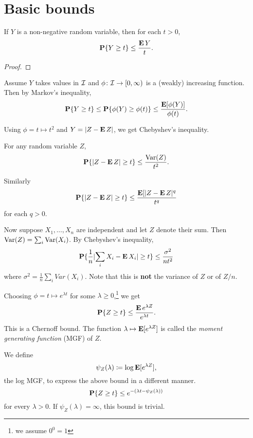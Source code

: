 \chapter{Basic bounds} \label{chp:1}
\begin{theorem} \label{thm:markov}
    If $Y$ is a non-negative random variable, then for each $t > 0$, \[
        \operatorname{\mathbf P} \{Y \ge t\} \le \frac{\operatorname{\mathbf E} Y}{t}.
    \]
\end{theorem}
\begin{proof}

\end{proof}
Assume $Y$ takes values in $\mathcal{I}$ and $\phi\colon \mcI \to [0, \infty)$ is a
(weakly) increasing function.
Then by Markov's inequality, \[
    \P\set{Y \ge t} \le \P\set{\phi(Y) \ge \phi(t)}
        \le \frac{\E[\phi(Y)]}{\phi(t)}.
\]

Using $\phi = t \mapsto t^2$ and $Y = \lvert Z - \operatorname{\mathbf E} Z\rvert$, we get Chebyshev's
inequality.
\begin{theorem} \label{thm:chebyshev}
    For any random variable $Z$, \[
        \operatorname{\mathbf P}\{\lvert Z - \operatorname{\mathbf E} Z\rvert \ge t\} \le \frac{\operatorname{Var}(Z)}{t^2}.
    \]
\end{theorem}
Similarly \[
    \operatorname{\mathbf P}\{\lvert Z - \operatorname{\mathbf E} Z\rvert \ge t\} \le \frac{\operatorname{\mathbf E}[\lvert Z - \operatorname{\mathbf E} Z\rvert^q}{t^q}
\] for each $q > 0$.

Now suppose $X_1, \dots, X_n$ are independent and let $Z$ denote their sum.
Then $\operatorname{Var}(Z) = \sum_i \operatorname{Var}(X_i)$.
By Chebyshev's inequality, \[
    \operatorname{\mathbf P}\{\frac1n \lvert\sum_i X_i - \operatorname{\mathbf E} X_i\rvert \ge t\} \le \frac{\sigma^2}{nt^2}
\] where $\sigma^2 = \frac1n \sum_i Var(X_i)$.
Note that this is \textbf{not} the variance of $Z$ or of $Z/n$.

Choosing $\phi = t \mapsto e^{\lambda t}$ for some $\lambda \ge 0$,\footnote{we assume $0^0 = 1$}
we get
\begin{equation}
    \operatorname{\mathbf P}\{Z \ge t\} \le \frac{\operatorname{\mathbf E} e^{\lambda Z}}{e^{\lambda t}}.
\end{equation}
This is a Chernoff bound.
The function $\lambda \mapsto \operatorname{\mathbf E}[e^{\lambda Z}]$ is called the
\emph{moment generating function} (MGF) of $Z$.

We define \[
    \psi_Z(\lambda) \coloneq \log \operatorname{\mathbf E}[e^{\lambda Z}],
\] the log MGF, to express the above bound in a different manner.
\begin{equation}
    \operatorname{\mathbf P}\{Z \ge t\} \le e^{-(\lambda t - \psi_Z(\lambda))}
\end{equation} for every $\lambda > 0$.
If $\psi_Z(\lambda) = \infty$, this bound is trivial.

